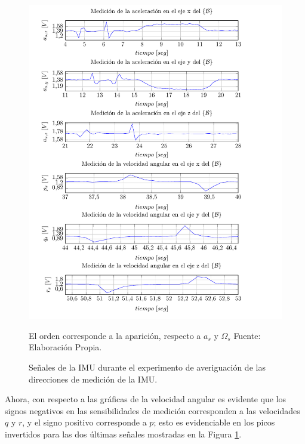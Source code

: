 \documentclass[10pt]{report}
\numberwithin{equation}{chapter}
\numberwithin{algorithm}{chapter}
\begin{document}
\begin{figure}
\begin{center}
\includegraphics[width=\textwidth]
{PlotIMU2.pdf}
\caption{Señales de la IMU durante el experimento de averiguación de las direcciones de medición de la IMU.}
\scriptsize{El orden corresponde a la aparición, respecto a $a_s$ y $\Omega_s$ Fuente: Elaboración Propia.}
\label{obtencion_fig9}
\end{center}
\end{figure}
Ahora, con respecto a las gráficas de la velocidad angular es evidente que los signos negativos en las sensibilidades de medición corresponden a las velocidades $q$ y $r$, y el signo positivo corresponde a $p$; esto es evidenciable en los picos invertidos para las dos últimas señales mostradas en la Figura \ref{obtencion_fig9}.
\end{document}
